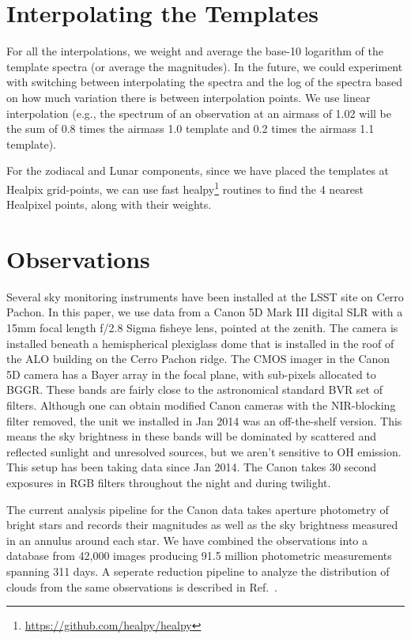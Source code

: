 \documentclass[]{spie}
\begin{document}
\section{Interpolating the Templates}\label{sec:interp}

For all the interpolations, we weight and average the base-10 logarithm of the template spectra (or average the magnitudes).  In the future, we could experiment with switching between interpolating the spectra and the log of the spectra based on how much variation there is between interpolation points.  We use linear interpolation (e.g., the spectrum of an observation at an airmass of 1.02 will be the sum of 0.8 times the airmass 1.0 template and 0.2 times the airmass 1.1 template). 

For the zodiacal and Lunar components, since we have placed the templates at Healpix grid-points, we can use fast healpy\footnote{\url{https://github.com/healpy/healpy}} routines to find the 4 nearest Healpixel points, along with their weights.  


\section{Observations}\label{sec:obs}

Several sky monitoring instruments have been installed at the LSST site on Cerro Pachon.  In this paper, we use data from a Canon 5D Mark III digital SLR with a 15mm focal length f/2.8 Sigma fisheye lens, pointed at the zenith. The camera is installed beneath a hemispherical plexiglass dome that is installed in the roof of the ALO building on the Cerro Pachon ridge.  The CMOS imager in the Canon 5D camera has a Bayer array in the focal plane, with sub-pixels allocated to BGGR.  These bands are fairly close to the astronomical standard BVR set of filters. Although one can obtain modified Canon cameras with the NIR-blocking filter removed, the unit we installed in Jan 2014 was an off-the-shelf version. This means the sky brightness in these bands will be dominated by scattered and reflected sunlight and unresolved sources, but we aren't sensitive to OH emission.  This setup has been taking data since Jan 2014.  The Canon takes 30 second exposures in RGB filters throughout the night and during twilight. 

The current analysis pipeline for the Canon data takes aperture photometry of bright stars and records their magnitudes as well as the sky brightness measured in an annulus around each star.  We have combined the observations into a database from 42,000 images producing 91.5 million photometric measurements spanning 311 days.  A seperate reduction pipeline to analyze the distribution of clouds from the same observations is described in Ref.~.
\end{document}
